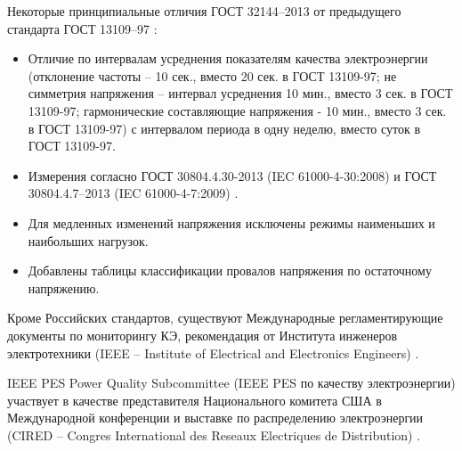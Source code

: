 Некоторые принципиальные отличия  ГОСТ 32144–2013 \cite{ГОСТ32144-2013} от предыдущего стандарта ГОСТ 13109–97 \cite{ГОСТ13109-97}: 
\begin{itemize}
	\item Отличие по интервалам усреднения показателям качества электроэнергии (отклонение частоты -- 10 сек., вместо 20 сек. в ГОСТ 13109-97; не симметрия напряжения -- интервал усреднения 10 мин., вместо 3 сек. в ГОСТ 13109-97; гармонические составляющие напряжения - 10 мин., вместо 3 сек. в ГОСТ 13109-97) с интервалом периода в одну неделю, вместо суток в ГОСТ 13109-97.
	\item Измерения согласно ГОСТ 30804.4.30-2013 (IEC 61000-4-30:2008) \cite{ГОСТ30804.4.30-2013} и ГОСТ 30804.4.7–2013 (IEC 61000-4-7:2009) \cite{ГОСТ30804.4.7-2013}.
	\item Для медленных изменений напряжения исключены режимы наименьших и наибольших нагрузок.
	\item Добавлены таблицы классификации провалов напряжения по остаточному напряжению.
\end{itemize}

Кроме Российских стандартов, существуют Международные регламентирующие документы по мониторингу КЭ, рекомендация от Института инженеров электротехники (IEEE -- Institute of Electrical and Electronics Engineers) \cite{IEEE_PES}. 

IEEE PES Power Quality Subcommittee (IEEE PES по качеству электроэнергии) участвует в качестве представителя Национального комитета США в Международной конференции и выставке по распределению электроэнергии (CIRED -- Congres International des Reseaux Electriques de Distribution) \cite{CIRED, CIRED_CONFERENCE}. 

